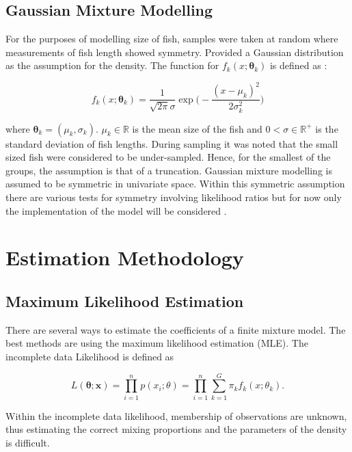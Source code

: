 \documentclass[12pt,letterpaper]{report}
\theoremstyle{definition}
\begin{document}
\section{Gaussian Mixture Modelling}

For the purposes of modelling size of fish, samples were taken at random where measurements of fish length showed symmetry. Provided a Gaussian distribution as the assumption for the density.  The function for $f_k( x ; \bm{ \theta }_k) $ is defined as : 

$$f_k(x;\bm{\theta}_k) = \frac{1}{\sqrt{2\pi}\sigma}\exp\bigg(-\frac{(x - \mu_k)^2}{2\sigma_k^2} \bigg)$$

where $\bm{\theta}_k = (\mu_k, \sigma_k)$.  $\mu_k \in \mathbb{R} $ is the mean size of the fish and $0 < \sigma \in \mathbb{R^+} $ is the standard deviation of fish lengths. During sampling it was noted that the small sized fish were considered to be under-sampled. Hence, for the smallest of the groups, the assumption is that of a truncation. Gaussian mixture modelling is assumed to be symmetric in univariate space. Within this symmetric assumption there are various tests for symmetry involving likelihood ratios but for now only the implementation of the model will be considered \citep{symGar}.

\chapter{Estimation Methodology}
\section{Maximum Likelihood Estimation} There are several ways to estimate the coefficients of a finite mixture model. The best methods are using the maximum likelihood estimation (MLE). The incomplete data Likelihood is defined as 

$$L(\bm{\theta}; \bm{x}) = \prod_{i=1}^np(x_i ; \theta) = \prod_{i=1}^n\sum_{k=1}^G \pi_k f_k(x;\theta_k). $$

Within the incomplete data likelihood, membership of observations are unknown, thus estimating the correct mixing proportions and the parameters of the density is difficult. 




\end{document}
